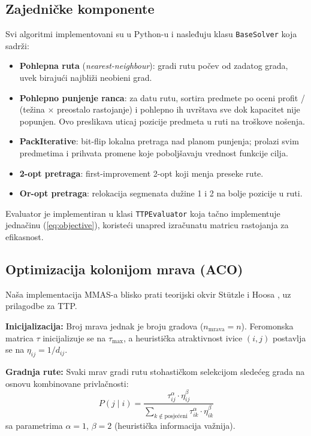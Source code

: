 \documentclass[12pt,a4paper]{article}
\begin{document}
\subsection{Zajedni\v{c}ke komponente}

Svi algoritmi implementovani su u Python-u i nasleđuju klasu \texttt{BaseSolver} koja sadr\v{z}i:
\begin{itemize}
    \item \textbf{Pohlepna ruta} (\textit{nearest-neighbour}): gradi rutu po\v{c}ev od zadatog grada, uvek biraju\'{c}i najbli\v{z}i neobi\dj{}eni grad.
    \item \textbf{Pohlepno punjenje ranca}: za datu rutu, sortira predmete po oceni profit / (te\v{z}ina $\times$ preostalo rastojanje) i pohlepno ih uvrštava sve dok kapacitet nije popunjen. Ovo preslikava uticaj pozicije predmeta u ruti na troškove no\v{s}enja.
    \item \textbf{PackIterative}: bit-flip lokalna pretraga nad planom punjenja; prolazi svim predmetima i prihvata promene koje pobolj\v{s}avaju vrednost funkcije cilja.
    \item \textbf{2-opt pretraga}: first-improvement 2-opt koji menja preseke rute.
    \item \textbf{Or-opt pretraga}: relokacija segmenata du\v{z}ine 1 i 2 na bolje pozicije u ruti.
\end{itemize}

Evaluator je implementiran u klasi \texttt{TTPEvaluator} koja ta\v{c}no implementuje jedna\v{c}inu (\ref{eq:objective}), koriste\'{c}i unapred izra\v{c}unatu matricu rastojanja za efikasnost.

\subsection{Optimizacija kolonijom mrava (ACO)}

Na\v{s}a implementacija MMAS-a blisko prati teorijski okvir St{\"u}tzle i Hoosa \cite{stutzle2000}, uz prilagodbe za TTP.

\textbf{Inicijalizacija:} Broj mrava jednak je broju gradova ($n_{\text{mrava}} = n$). Feromonska matrica $\tau$ inicijalizuje se na $\tau_{\max}$, a heuristi\v{c}ka atraktivnost ivice $(i, j)$ postavlja se na $\eta_{ij} = 1/d_{ij}$.

\textbf{Gradnja rute:} Svaki mrav gradi rutu stohasti\v{c}kom selekcijom slede\'{c}eg grada na osnovu kombinovane privla\v{c}nosti:
\begin{equation}
    P(j \mid i) = \frac{\tau_{ij}^\alpha \cdot \eta_{ij}^\beta}{\sum_{k \notin \text{posje\'{c}eni}} \tau_{ik}^\alpha \cdot \eta_{ik}^\beta}
\end{equation}
sa parametrima $\alpha = 1$, $\beta = 2$ (heuristi\v{c}ka informacija va\v{z}nija).
\end{document}
